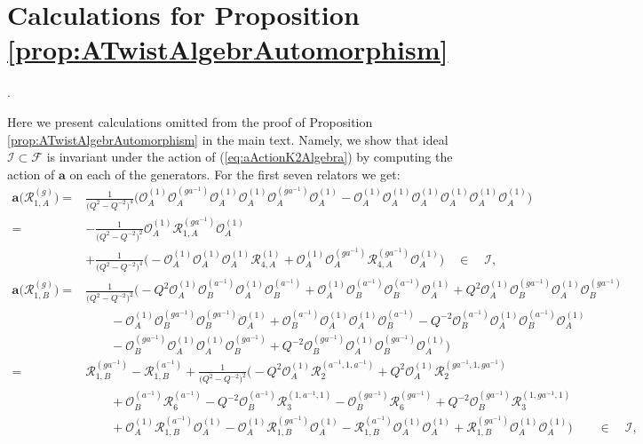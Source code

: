 \documentclass{amsart}
\newcommand{\Oa}{\mathcal O_A}
\newcommand{\Ob}{\mathcal O_B}
\newcommand{\R}{\mathcal R}
\begin{document}
\appendix

\section{Calculations for Proposition \ref{prop:ATwistAlgebrAutomorphism}}.
\label{sec:IdealIInvariateAutomorphismA}

Here we present calculations omitted from the proof of Proposition \ref{prop:ATwistAlgebrAutomorphism} in the main text. Namely, we show that ideal $\mathcal I\subset\mathcal F$ is invariant under the action of (\ref{eq:aActionK2Algebra}) by computing the action of $\mathbf a$ on each of the generators. For the first seven relators we get:
\begin{align*}
\mathbf a\big(\R_{1,A}^{(g)}\big)=&\frac1{\big(Q^2-Q^{-2}\big)^4}\Big(\Oa^{(1)}\Oa^{(ga^{-1})}\Oa^{(1)}\Oa^{(1)}\Oa^{(ga^{-1})}\Oa^{(1)}-\Oa^{(1)}\Oa^{(1)}\Oa^{(1)}\Oa^{(1)}\Oa^{(1)}\Oa^{(1)}\Big)\\
=&-\frac1{\big(Q^2-Q^{-2}\big)^2}\Oa^{(1)}\R_{1,A}^{(ga^{-1})}\Oa^{(1)}\\
&+\frac1{\big(Q^2-Q^{-2}\big)^4}\Big(-\Oa^{(1)}\Oa^{(1)}\Oa^{(1)}\R_{4,A}^{(1)}+\Oa^{(1)}\Oa^{(ga^{-1})}\R_{4,A}^{(ga^{-1})}\Oa^{(1)}\Big)\quad\in\quad\mathcal I,\\[1em]
\mathbf a\big(\R_{1,B}^{(g)}\big)=&\frac1{\big(Q^2-Q^{-2}\big)^2}\Big(-Q^2\Oa^{(1)}\Ob^{(a^{-1})}\Oa^{(1)}\Ob^{(a^{-1})}+\Oa^{(1)}\Ob^{(a^{-1})}\Ob^{(a^{-1})}\Oa^{(1)}+Q^2\Oa^{(1)}\Ob^{(ga^{-1})}\Oa^{(1)}\Ob^{(ga^{-1})}\\
&\qquad-\Oa^{(1)}\Ob^{(ga^{-1})}\Ob^{(ga^{-1})}\Oa^{(1)}+\Ob^{(a^{-1})}\Oa^{(1)}\Oa^{(1)}\Ob^{(a^{-1})}-Q^{-2}\Ob^{(a^{-1})}\Oa^{(1)}\Ob^{(a^{-1})}\Oa^{(1)}\\
&\qquad-\Ob^{(ga^{-1})}\Oa^{(1)}\Oa^{(1)}\Ob^{(ga^{-1})}+Q^{-2}\Ob^{(ga^{-1})}\Oa^{(1)}\Ob^{(ga^{-1})}\Oa^{(1)}\Big)\\
=&\R_{1,B}^{(ga^{-1})}-\R_{1,B}^{(a^{-1})}+\frac1{\big(Q^2-Q^{-2}\big)^2}\Big(-Q^2\Oa^{(1)}\R_{2}^{(a^{-1},1,a^{-1})}+Q^2\Oa^{(1)}\R_{2}^{(ga^{-1},1,ga^{-1})}\\
&\qquad+\Ob^{(a^{-1})}\R_{6}^{(a^{-1})}-Q^{-2}\Ob^{(a^{-1})}\R_{3}^{(1,a^{-1},1)}-\Ob^{(ga^{-1})}\R_{6}^{(ga^{-1})}+Q^{-2}\Ob^{(ga^{-1})}\R_{3}^{(1,ga^{-1},1)}\\
&\qquad+\Oa^{(1)}\R_{1,B}^{(a^{-1})}\Oa^{(1)}-\Oa^{(1)}\R_{1,B}^{(ga^{-1})}\Oa^{(1)}-\R_{1,B}^{(a^{-1})}\Oa^{(1)}\Oa^{(1)}+\R_{1,B}^{(ga^{-1})}\Oa^{(1)}\Oa^{(1)}\Big)\qquad\in\quad\mathcal I,\\[1em]

\end{align*}
\end{document}
